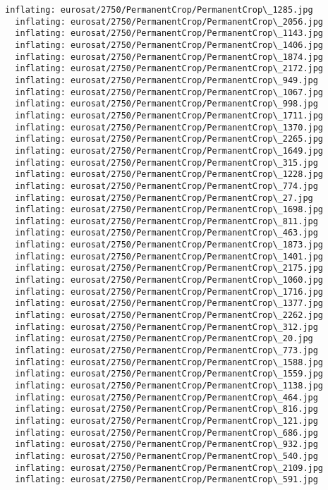 \documentclass[11pt]{article}
\begin{document}
\begin{Verbatim}[commandchars=\\\{\}]
  inflating: eurosat/2750/PermanentCrop/PermanentCrop\_1285.jpg
  inflating: eurosat/2750/PermanentCrop/PermanentCrop\_2056.jpg
  inflating: eurosat/2750/PermanentCrop/PermanentCrop\_1143.jpg
  inflating: eurosat/2750/PermanentCrop/PermanentCrop\_1406.jpg
  inflating: eurosat/2750/PermanentCrop/PermanentCrop\_1874.jpg
  inflating: eurosat/2750/PermanentCrop/PermanentCrop\_2172.jpg
  inflating: eurosat/2750/PermanentCrop/PermanentCrop\_949.jpg
  inflating: eurosat/2750/PermanentCrop/PermanentCrop\_1067.jpg
  inflating: eurosat/2750/PermanentCrop/PermanentCrop\_998.jpg
  inflating: eurosat/2750/PermanentCrop/PermanentCrop\_1711.jpg
  inflating: eurosat/2750/PermanentCrop/PermanentCrop\_1370.jpg
  inflating: eurosat/2750/PermanentCrop/PermanentCrop\_2265.jpg
  inflating: eurosat/2750/PermanentCrop/PermanentCrop\_1649.jpg
  inflating: eurosat/2750/PermanentCrop/PermanentCrop\_315.jpg
  inflating: eurosat/2750/PermanentCrop/PermanentCrop\_1228.jpg
  inflating: eurosat/2750/PermanentCrop/PermanentCrop\_774.jpg
  inflating: eurosat/2750/PermanentCrop/PermanentCrop\_27.jpg
  inflating: eurosat/2750/PermanentCrop/PermanentCrop\_1698.jpg
  inflating: eurosat/2750/PermanentCrop/PermanentCrop\_811.jpg
  inflating: eurosat/2750/PermanentCrop/PermanentCrop\_463.jpg
  inflating: eurosat/2750/PermanentCrop/PermanentCrop\_1873.jpg
  inflating: eurosat/2750/PermanentCrop/PermanentCrop\_1401.jpg
  inflating: eurosat/2750/PermanentCrop/PermanentCrop\_2175.jpg
  inflating: eurosat/2750/PermanentCrop/PermanentCrop\_1060.jpg
  inflating: eurosat/2750/PermanentCrop/PermanentCrop\_1716.jpg
  inflating: eurosat/2750/PermanentCrop/PermanentCrop\_1377.jpg
  inflating: eurosat/2750/PermanentCrop/PermanentCrop\_2262.jpg
  inflating: eurosat/2750/PermanentCrop/PermanentCrop\_312.jpg
  inflating: eurosat/2750/PermanentCrop/PermanentCrop\_20.jpg
  inflating: eurosat/2750/PermanentCrop/PermanentCrop\_773.jpg
  inflating: eurosat/2750/PermanentCrop/PermanentCrop\_1588.jpg
  inflating: eurosat/2750/PermanentCrop/PermanentCrop\_1559.jpg
  inflating: eurosat/2750/PermanentCrop/PermanentCrop\_1138.jpg
  inflating: eurosat/2750/PermanentCrop/PermanentCrop\_464.jpg
  inflating: eurosat/2750/PermanentCrop/PermanentCrop\_816.jpg
  inflating: eurosat/2750/PermanentCrop/PermanentCrop\_121.jpg
  inflating: eurosat/2750/PermanentCrop/PermanentCrop\_686.jpg
  inflating: eurosat/2750/PermanentCrop/PermanentCrop\_932.jpg
  inflating: eurosat/2750/PermanentCrop/PermanentCrop\_540.jpg
  inflating: eurosat/2750/PermanentCrop/PermanentCrop\_2109.jpg
  inflating: eurosat/2750/PermanentCrop/PermanentCrop\_591.jpg

\end{Verbatim}
\end{document}
